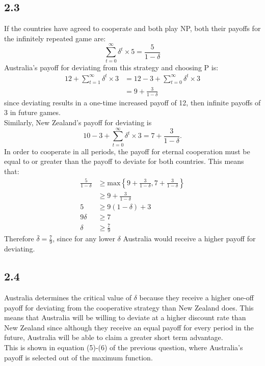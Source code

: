 \documentclass{article}
\begin{document}
\subsection*{2.3}
If the countries have agreed to cooperate and both play NP, both their payoffs for the infinitely repeated game are:
$$\sum_{t=0}^{\infty} \delta^{t} \times 5 = \frac{5}{1 - \delta}$$
Australia's payoff for deviating from this strategy and choosing P is:
\begin{align*}
    12 + \sum_{t=1}^{\infty} \delta^{t} \times 3 &= 12 - 3 + \sum_{t=0}^{\infty} \delta^{t} \times 3\\
    &= 9 + \frac{3}{1 - \delta}
\end{align*}
since deviating results in a one-time increased payoff of 12, then infinite payoffs of 3 in future games.\\[2mm]
Similarly, New Zealand's payoff for deviating is
$$10 - 3 + \sum_{t=0}^{\infty} \delta^{t} \times 3 = 7 + \frac{3}{1 - \delta}.$$
In order to cooperate in all periods, the payoff for eternal cooperation must be equal to or greater than the payoff to deviate for both countries. This means that:
\begin{align}
    \frac{5}{1 - \delta} &\geq \mbox{max}\left\{ 9 + \frac{3}{1 - \delta}, 7 + \frac{3}{1 - \delta} \right\}\\
    &\geq 9 + \frac{3}{1 - \delta}\\
    5 &\geq 9(1 - \delta) + 3\\
    9 \delta &\geq 7\\
    \delta &\geq \frac{7}{9}
\end{align}
Therefore $\bar{\delta} = \frac{7}{9}$, since for any lower $\delta$ Australia would receive a higher payoff for deviating.

\subsection*{2.4}
Australia determines the critical value of $\delta$ because they receive a higher one-off payoff for deviating from the cooperative strategy than New Zealand does. This means that Australia will be willing to deviate at a higher discount rate than New Zealand since although they receive an equal payoff for every period in the future, Australia will be able to claim a greater short term advantage.\\[2mm]
This is shown in equation (5)-(6) of the previous question, where Australia's payoff is selected out of the maximum function.
\end{document}
